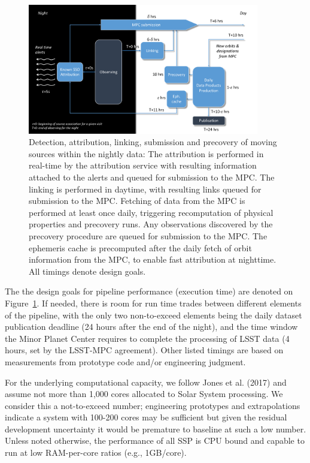\begin{figure}[th]
\begin{center}
\includegraphics[width=0.9\textwidth]{figures/solarsystempipeline.pdf}
\caption{\label{fig:apMOPS} Detection, attribution, linking, submission and precovery of moving sources within the nightly data: The attribution is performed in real-time by the attribution service with resulting information attached to the alerts and queued for submission to the MPC. The linking is performed in daytime, with resulting links queued for submission to the MPC. Fetching of data from the MPC is performed at least once daily, triggering recomputation of physical properties and precovery runs. Any observations discovered by the precovery procedure are queued for submission to the MPC. The ephemeris cache is precomputed after the daily fetch of orbit information from the MPC, to enable fast attribution at nighttime. All timings denote design goals. }
\end{center}
\end{figure}

The the design goals for pipeline performance (execution time) are denoted on Figure~\ref{fig:apMOPS}. If needed, there is room for run time trades between different elements of the pipeline, with the only two non-to-exceed elements being the daily dataset publication deadline (24 hours after the end of the night), and the time window the Minor Planet Center requires to complete the processing of LSST data (4 hours, set by the LSST-MPC agreement). Other listed timings are based on measurements from prototype code and/or engineering judgment.

For the underlying computational capacity, we follow Jones et al. (2017) and assume not more than 1,000 cores allocated to Solar System processing. We consider this a not-to-exceed number; engineering prototypes and extrapolations indicate a system with 100-200 cores may be sufficient but given the residual development uncertainty it would be premature to baseline at such a low number. Unless noted otherwise, the performance of all SSP is CPU bound and capable to run at low RAM-per-core ratios (e.g., 1GB/core).

